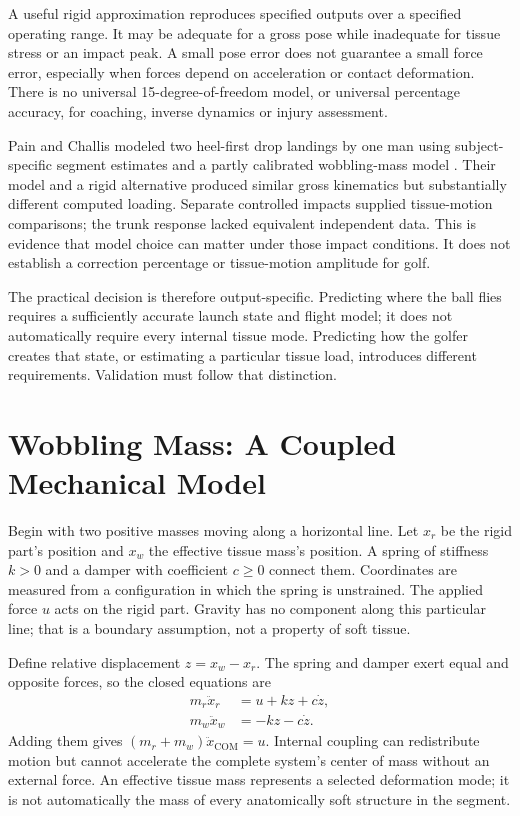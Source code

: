 A useful rigid approximation reproduces specified outputs over a specified operating range. It may be adequate for a gross pose while inadequate for tissue stress or an impact peak. A small pose error does not guarantee a small force error, especially when forces depend on acceleration or contact deformation. There is no universal 15-degree-of-freedom model, or universal percentage accuracy, for coaching, inverse dynamics or injury assessment.

Pain and Challis modeled two heel-first drop landings by one man using subject-specific segment estimates and a partly calibrated wobbling-mass model \citep{Pain2006Wobble}. Their model and a rigid alternative produced similar gross kinematics but substantially different computed loading. Separate controlled impacts supplied tissue-motion comparisons; the trunk response lacked equivalent independent data. This is evidence that model choice can matter under those impact conditions. It does not establish a correction percentage or tissue-motion amplitude for golf.

The practical decision is therefore output-specific. Predicting where the ball flies requires a sufficiently accurate launch state and flight model; it does not automatically require every internal tissue mode. Predicting how the golfer creates that state, or estimating a particular tissue load, introduces different requirements. Validation must follow that distinction.

\section{Wobbling Mass: A Coupled Mechanical Model}
\label{eq:wobble_eom}
\label{sec:wobbling_mass}

Begin with two positive masses moving along a horizontal line. Let $x_r$ be the rigid part's position and $x_w$ the effective tissue mass's position. A spring of stiffness $k>0$ and a damper with coefficient $c\geq0$ connect them. Coordinates are measured from a configuration in which the spring is unstrained. The applied force $u$ acts on the rigid part. Gravity has no component along this particular line; that is a boundary assumption, not a property of soft tissue.

Define relative displacement $z=x_w-x_r$. The spring and damper exert equal and opposite forces, so the closed equations are
\[
\begin{aligned}
m_r\ddot x_r&=u+kz+c\dot z,\\
m_w\ddot x_w&=-kz-c\dot z.
\end{aligned}
\]
Adding them gives $(m_r+m_w)\ddot x_{\mathrm{COM}}=u$. Internal coupling can redistribute motion but cannot accelerate the complete system's center of mass without an external force. An effective tissue mass represents a selected deformation mode; it is not automatically the mass of every anatomically soft structure in the segment.

